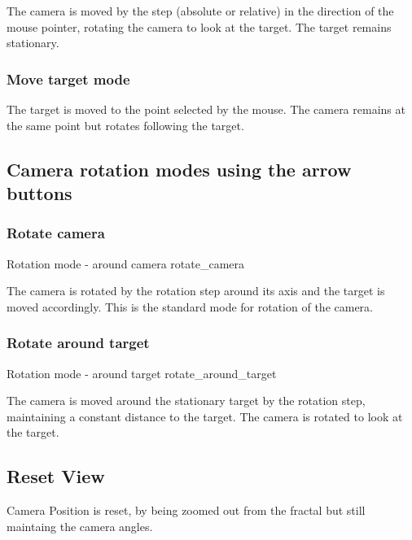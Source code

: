 The camera is moved by the step (absolute or relative) in the direction of the
mouse pointer, rotating the camera to look at the target. The target remains
stationary.

\subsubsection{Move target mode}\label{move-target-mode-1}

The target is moved to the point selected by the mouse. The camera remains at
the same point but rotates following the target.

\subsection{Camera rotation modes using the arrow
	buttons}\label{camera-rotation-modes-using-the-arrow-buttons}

\subsubsection{Rotate camera}\label{rotate-camera}

{Rotation mode - around camera}
{rotate_camera}

The camera is rotated by the rotation step around its axis and the target is
moved accordingly. This is the standard mode for rotation of the camera.

\subsubsection{Rotate around target}\label{rotate-around-target}

{Rotation mode - around target}
{rotate_around_target}

The camera is moved around the stationary target by the rotation step,
maintaining a constant distance to the target. The camera is rotated to look at
the target.

\subsection{Reset View}\label{reset-view}

Camera Position is reset, by being zoomed out from the fractal but still
maintaing the camera angles.

